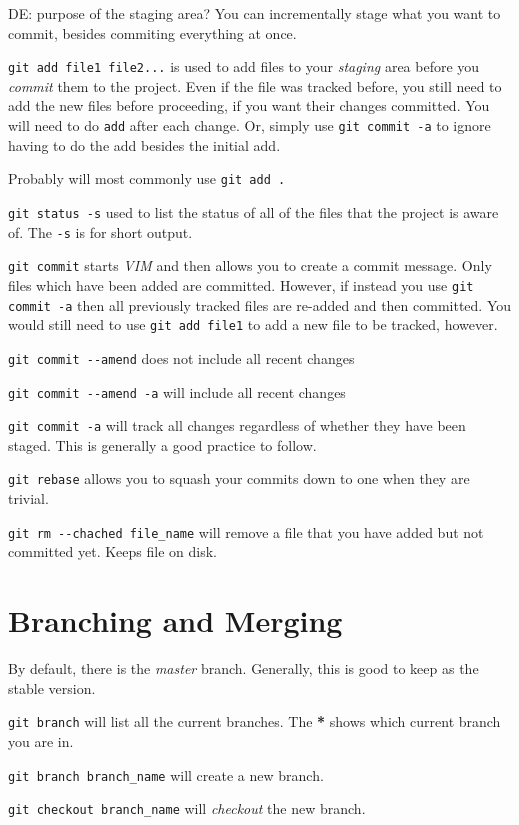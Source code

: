 \documentclass{article}
\begin{document}
DE: purpose of the staging area? You can incrementally stage what you want to commit, besides commiting everything at once.

\verb|git add file1 file2...| is used to add files to your \emph{staging} area
before you \emph{commit} them to the project. Even if the file was tracked
before, you still need to add the new files before proceeding, if you want
their changes committed. You will need to do \verb|add| after each change. Or, simply use \verb|git commit -a| to ignore having to do the add besides the initial add.

Probably will most commonly use \verb|git add .| 

\verb|git status -s| used to list the status of all of the files that the
project is aware of. The \verb|-s| is for short output.

\verb|git commit| starts \emph{VIM} and then allows you to create a commit
message. Only files which have been added are committed. However, if instead
you use \verb|git commit -a| then all previously tracked files are re-added and
then committed. You would still need to use \verb|git add file1| to add a new
file to be tracked, however.

\verb|git commit --amend| does not include all recent changes

\verb|git commit --amend -a| will include all recent changes

\verb|git commit -a| will track all changes regardless of whether they have been staged. This is generally a good practice to follow.

\verb|git rebase| allows you to squash your commits down to one when they are trivial.

\verb|git rm --chached file_name| will remove a file that you have added but not committed yet. Keeps file on disk.

\section{Branching and Merging}

By default, there is the \emph{master} branch. Generally, this is good to keep as the stable version.

\verb|git branch| will list all the current branches. The \textbf{*} shows which current branch you are in.

\verb|git branch branch_name| will create a new branch.

\verb|git checkout branch_name| will \emph{checkout} the new branch.
\end{document}
